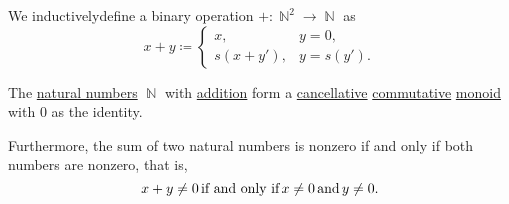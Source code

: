 \begin{definition}\label{def:natural_number_addition}
  We inductively\IND define a binary  operation \( +: \BbbN^2 \to \BbbN \) as
  \begin{equation}\label{eq:def:natural_number_addition}
    x + y \coloneqq \begin{cases}
      x,         &y = 0,     \\
      s(x + y'), &y = s(y').
    \end{cases}
  \end{equation}
\end{definition}

\begin{proposition}\label{thm:natural_numbers_form_monoid_under_addition}
  The \hyperref[def:natural_numbers]{natural numbers} \( \BbbN \) with \hyperref[def:natural_number_addition]{addition} form a \hyperref[def:magma/cancellative]{cancellative} \hyperref[def:magma/commutative]{commutative} \hyperref[def:unital_magma/associative]{monoid} with \( 0 \) as the identity.

  Furthermore, the sum of two natural numbers is nonzero if and only if both numbers are nonzero, that is,
  \begin{equation}\label{eq:thm:natural_numbers_form_monoid_under_addition/nonzero_sum}
    x + y \neq 0 \mathop{\text{if and only if}} x \neq 0 \mathop{\text{and}} y \neq 0.
  \end{equation}
\end{proposition}
